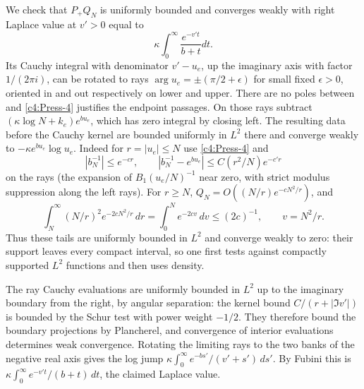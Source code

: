 We check that \(P_+Q_N\) is uniformly bounded and converges weakly with right Laplace value at \(v'>0\) equal to
\[
                       \kappa\int_0^\infty \frac{e^{-v't}}{b+t}dt .
\]
Its Cauchy integral with denominator \(v'-u_e\), up the imaginary axis with factor \(1/(2\pi i)\), can be rotated to rays \(\arg u_e=\pm(\pi/2+\epsilon)\) for small fixed \(\epsilon>0\), oriented in and out respectively on lower and upper. There are no poles between and \eqref{c4:Press-4} justifies the endpoint passages. On those rays subtract \((\kappa\log N+k_e)e^{bu_e}\), which has zero integral by closing left. The resulting data before the Cauchy kernel are bounded uniformly in \(L^2\) there and converge weakly to \(-\kappa e^{bu_e}\log u_e\). Indeed for \(r=|u_e|\le N\) use \eqref{c4:Press-4} and
\[
        |b_N^{-1}|\le e^{-cr},\qquad |b_N^{-1}-e^{bu_e}|\le C(r^2/N)e^{-c' r}
\]
on the rays (the expansion of \(B_1(u_e/N)^{-1}\) near zero, with strict
modulus suppression along the left rays). For \(r\ge N\),
\(Q_N=O((N/r)e^{-cN^2/r})\), and
\[
 \int_N^\infty (N/r)^2e^{-2cN^2/r}\,dr
       =\int_0^N e^{-2c v}\,dv\le (2c)^{-1},\qquad v=N^2/r.
\]
Thus these tails are uniformly bounded in \(L^2\) and converge weakly
to zero: their support leaves every compact interval, so one first tests
against compactly supported \(L^2\) functions and then uses density.

The ray Cauchy evaluations are uniformly bounded in \(L^2\) up to the
imaginary boundary from the right, by angular separation: the kernel
bound \(C/(r+|\Im v'|)\) is bounded by the Schur test with power weight
\(-1/2\). They therefore bound the boundary projections by Plancherel,
and convergence of interior evaluations determines weak convergence.
Rotating the limiting rays to the two banks of the negative real axis
gives the log jump
\(\kappa\int_0^\infty e^{-b s'}/(v'+s')\,ds'\). By Fubini this is
\(\kappa\int_0^\infty e^{-v't}/(b+t)\,dt\), the claimed Laplace value.

